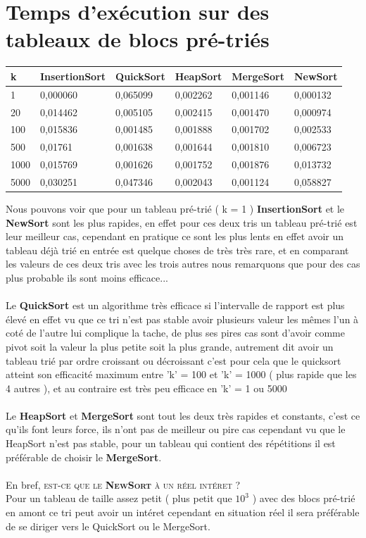\documentclass[a4paper, 11pt, oneside]{article}
\begin{document}
\section{Temps d'exécution sur des tableaux de blocs pré-triés}
\begin{table}[htb]
\begin{tabular}{llllll}
\hline
k    & InsertionSort & QuickSort & HeapSort & MergeSort & NewSort \\ \hline
1    & 0,000060              & 0,065099          & 0,002262         & 0,001146          & 0,000132        \\
20   & 0,014462              & 0,005105          & 0,002415         & 0,001470          & 0,000974        \\
100  & 0,015836              & 0,001485          & 0,001888      & 0,001702          & 0,002533        \\
500  & 0,01761              & 0,001638          & 0,001644         & 0,001810          & 0,006723        \\
1000 & 0,015769              & 0,001626          & 0,001752         & 0,001876          & 0,013732        \\
5000 & 0,030251              & 0,047346          & 0,002043         & 0,001124          & 0,058827       
\end{tabular}
\end{table}
Nous pouvons voir que pour un tableau pré-trié ( k = 1 ) \textbf{InsertionSort} et le \textbf{NewSort} sont les plus rapides, en effet pour ces deux tris un tableau pré-trié est leur meilleur cas, cependant en pratique ce sont les plus lents en effet avoir un tableau déjà trié en entrée est quelque choses de très très rare, et en comparant les valeurs de ces deux tris avec les trois autres nous remarquons que pour des cas plus probable ils sont moins efficace... \\ \\
Le \textbf{QuickSort} est un algorithme très efficace si l'intervalle de rapport est plus élevé en effet vu que ce tri n'est pas stable avoir plusieurs valeur les mêmes l'un à coté de l'autre lui complique la tache, de plus ses pires cas sont d'avoir comme pivot soit la valeur la plus petite soit la plus grande, autrement dit avoir un tableau trié par ordre croissant ou décroissant c'est pour cela que le quicksort atteint son efficacité maximum entre 'k' = 100 et 'k' = 1000 ( plus rapide que les 4 autres ), et au contraire est très peu efficace en 'k' = 1 ou 5000\\
\\
Le \textbf{HeapSort} et \textbf{MergeSort} sont tout les deux très rapides et constants, c'est ce qu'ils font leurs force, ils n'ont pas de meilleur ou pire cas cependant vu que le HeapSort n'est pas stable, pour un tableau qui contient des répétitions il est préférable de choisir le \textbf{MergeSort}.
\\ \\
En bref, \textsc{est-ce que le \textbf{NewSort} à un réel intéret ?} \\ Pour un tableau de taille assez petit ( plus petit que $10^{3}$ ) avec des blocs pré-trié en amont ce tri peut avoir un intéret cependant en situation réel il sera préférable de se diriger vers le QuickSort ou le MergeSort. 
 
\end{document}
